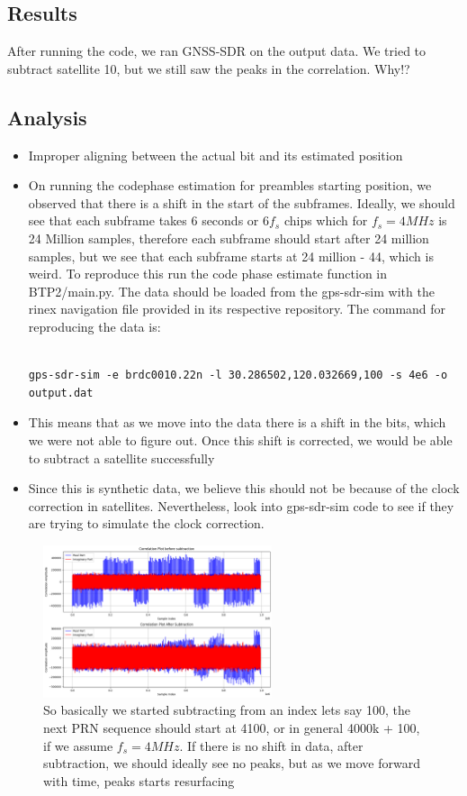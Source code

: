 \documentclass[12pt]{report}
\begin{document}
\subsection{Results}
After running the code, we ran GNSS-SDR on the output data. We tried to subtract satellite 10, but we still saw the peaks in the correlation. Why!?
\subsection{Analysis}
\begin{itemize}
  \item Improper aligning between the actual bit and its estimated position
  \item On running the codephase estimation for preambles starting position, we observed that there is a shift in the start of the subframes. Ideally, we should see that
each subframe takes 6 seconds or $6f_s$ chips which for $f_s = 4MHz$ is 24 Million samples, therefore each subframe should start after 24 million samples, but we see that each subframe starts at 24 million - 44, which is weird. 
To reproduce this run the code phase estimate function in BTP2/main.py. The data should be loaded from the gps-sdr-sim with the rinex navigation file provided in its respective repository. 
The command for reproducing the data is:

\begin{verbatim}

gps-sdr-sim -e brdc0010.22n -l 30.286502,120.032669,100 -s 4e6 -o output.dat
\end{verbatim}


  \item This means that as we move into the data there is a shift in the bits, which we were not able to figure out. Once this shift is corrected, we would be able to subtract a satellite successfully
  \item Since this is synthetic data, we believe this should not be because of the clock correction in satellites. Nevertheless, look into gps-sdr-sim code to see if they are trying to simulate the clock correction.
\end{itemize}

\begin{figure}[H]
  \centering
  \includegraphics[width=0.6\textwidth]{misalign.png}
  \caption{So basically we started subtracting from an index lets say 100, the next PRN sequence should start at 4100, or in general 4000k + 100, if we assume $f_s = 4MHz$. If there is no shift in data, after subtraction, we should ideally see no peaks, but as we move forward with time, peaks starts resurfacing}
  \label{fig:misalign}
\end{figure}
\end{document}
